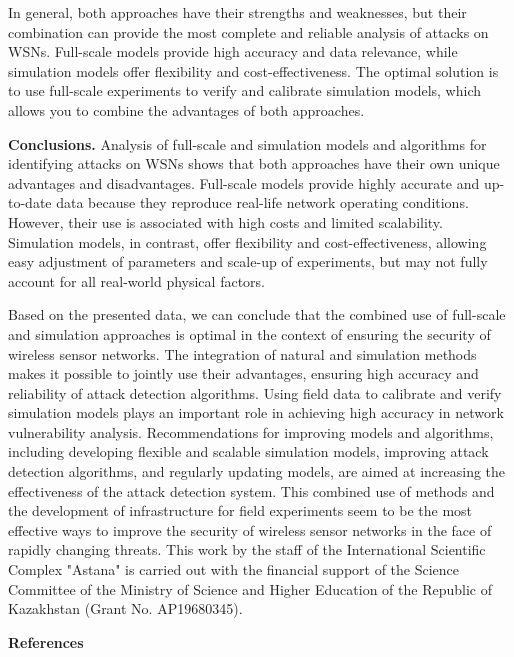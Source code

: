 \begin{multicols}{2}

In general, both approaches have their strengths and weaknesses, but
their combination can provide the most complete and reliable analysis of
attacks on WSNs. Full-scale models provide high accuracy and data
relevance, while simulation models offer flexibility and
cost-effectiveness. The optimal solution is to use full-scale
experiments to verify and calibrate simulation models, which allows you
to combine the advantages of both approaches.

{\bfseries Conclusions.} Analysis of full-scale and simulation models and
algorithms for identifying attacks on WSNs shows that both approaches
have their own unique advantages and disadvantages. Full-scale models
provide highly accurate and up-to-date data because they reproduce
real-life network operating conditions. However, their use is associated
with high costs and limited scalability. Simulation models, in contrast,
offer flexibility and cost-effectiveness, allowing easy adjustment of
parameters and scale-up of experiments, but may not fully account for
all real-world physical factors.

Based on the presented data, we can conclude that the combined use of
full-scale and simulation approaches is optimal in the context of
ensuring the security of wireless sensor networks. The integration of
natural and simulation methods makes it possible to jointly use their
advantages, ensuring high accuracy and reliability of attack detection
algorithms. Using field data to calibrate and verify simulation models
plays an important role in achieving high accuracy in network
vulnerability analysis. Recommendations for improving models and
algorithms, including developing flexible and scalable simulation
models, improving attack detection algorithms, and regularly updating
models, are aimed at increasing the effectiveness of the attack
detection system. This combined use of methods and the development of
infrastructure for field experiments seem to be the most effective ways
to improve the security of wireless sensor networks in the face of
rapidly changing threats. This work by the staff of the International
Scientific Complex "Astana" is carried out with the financial support of
the Science Committee of the Ministry of Science and Higher Education of
the Republic of Kazakhstan (Grant No. AP19680345).
\end{multicols}

\begin{center}
  {\bfseries References}
  \end{center}

